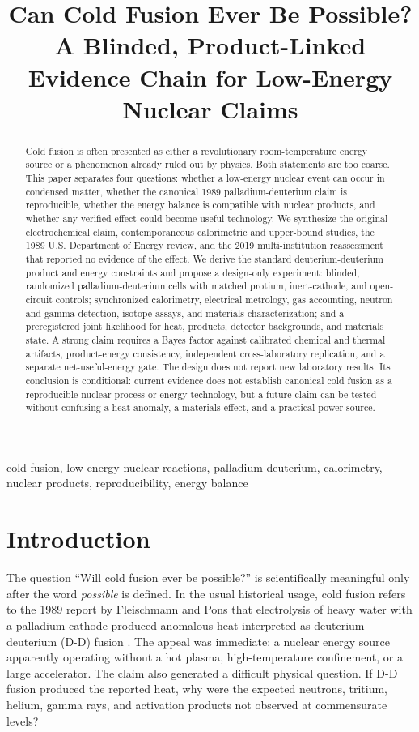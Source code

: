 \documentclass[conference]{IEEEtran}
\title{Can Cold Fusion Ever Be Possible?\\A Blinded, Product-Linked Evidence Chain for Low-Energy Nuclear Claims}
\author{\IEEEauthorblockN{Research Design Report}\IEEEauthorblockA{Four-Agent Scientific Workflow: Survey--Idea--ExperimentDesign--Author}}
\begin{document}
\maketitle

\begin{abstract}
Cold fusion is often presented as either a revolutionary room-temperature energy source or a phenomenon already ruled out by physics. Both statements are too coarse. This paper separates four questions: whether a low-energy nuclear event can occur in condensed matter, whether the canonical 1989 palladium-deuterium claim is reproducible, whether the energy balance is compatible with nuclear products, and whether any verified effect could become useful technology. We synthesize the original electrochemical claim, contemporaneous calorimetric and upper-bound studies, the 1989 U.S. Department of Energy review, and the 2019 multi-institution reassessment that reported no evidence of the effect. We derive the standard deuterium-deuterium product and energy constraints and propose a design-only experiment: blinded, randomized palladium-deuterium cells with matched protium, inert-cathode, and open-circuit controls; synchronized calorimetry, electrical metrology, gas accounting, neutron and gamma detection, isotope assays, and materials characterization; and a preregistered joint likelihood for heat, products, detector backgrounds, and materials state. A strong claim requires a Bayes factor against calibrated chemical and thermal artifacts, product-energy consistency, independent cross-laboratory replication, and a separate net-useful-energy gate. The design does not report new laboratory results. Its conclusion is conditional: current evidence does not establish canonical cold fusion as a reproducible nuclear process or energy technology, but a future claim can be tested without confusing a heat anomaly, a materials effect, and a practical power source.
\end{abstract}

\begin{IEEEkeywords}
cold fusion, low-energy nuclear reactions, palladium deuterium, calorimetry, nuclear products, reproducibility, energy balance
\end{IEEEkeywords}

\section{Introduction}
\label{sec:intro}
The question ``Will cold fusion ever be possible?'' is scientifically meaningful only after the word \emph{possible} is defined. In the usual historical usage, cold fusion refers to the 1989 report by Fleischmann and Pons that electrolysis of heavy water with a palladium cathode produced anomalous heat interpreted as deuterium-deuterium (D-D) fusion \cite{fp1989}. The appeal was immediate: a nuclear energy source apparently operating without a hot plasma, high-temperature confinement, or a large accelerator. The claim also generated a difficult physical question. If D-D fusion produced the reported heat, why were the expected neutrons, tritium, helium, gamma rays, and activation products not observed at commensurate levels?
\end{document}
